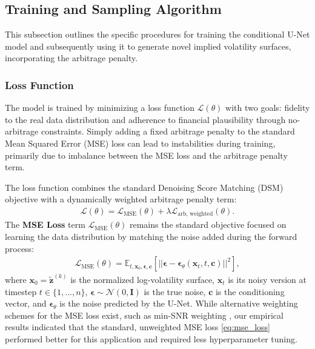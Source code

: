 \documentclass{article}
\newcommand{\eqlnostar}[2]{\begin{align}\label{#1}#2\end{align}}
\begin{document}
\subsection{Training and Sampling Algorithm}

This subsection outlines the specific procedures for training the conditional U-Net model and subsequently using it to generate novel implied volatility surfaces, incorporating the arbitrage penalty.

\subsubsection{Loss Function}

The model is trained by minimizing a loss function $\mathcal{L}(\theta)$ with two goals: fidelity to the real data distribution and adherence to financial plausibility through no-arbitrage constraints. Simply adding a fixed arbitrage penalty to the standard Mean Squared Error (MSE) loss can lead to instabilities during training, primarily due to imbalance between the MSE loss and the arbitrage penalty term.

The loss function combines the standard Denoising Score Matching (DSM) objective with a dynamically weighted arbitrage penalty term:
\eqlnostar{eq:total_loss}{
\mathcal{L}(\theta) = \mathcal{L}_{\text{MSE}}(\theta) + \lambda \mathcal{L}_{\text{arb, weighted}}(\theta).
}
The \textbf{MSE Loss} term $\mathcal{L}_{\text{MSE}}(\theta)$ remains the standard objective focused on learning the data distribution by matching the noise added during the forward process:
\eqlnostar{eq:mse_loss}{
\mathcal{L}_{\text{MSE}}(\theta) = \mathbb{E}_{t, \mathbf{x}_0, \boldsymbol{\epsilon}, \mathbf{c}} \left[ || \boldsymbol{\epsilon} - \boldsymbol{\epsilon}_\theta(\mathbf{x}_t, t, \mathbf{c}) ||^2 \right],
}
where $\mathbf{x}_0 = \tilde{\mathbf{z}}^{(k)}$ is the normalized log-volatility surface, $\mathbf{x}_t$ is its noisy version at timestep $t \in \{1, ..., n\}$, $\boldsymbol{\epsilon} \sim \mathcal{N}(0, \mathbf{I})$ is the true noise, $\mathbf{c}$ is the conditioning vector, and $\boldsymbol{\epsilon}_\theta$ is the noise predicted by the U-Net. While alternative weighting schemes for the MSE loss exist, such as min-SNR weighting \citep{Hang_Gu_Li_Bao_Chen_Hu_Geng_Guo_2024}, our empirical results indicated that the standard, unweighted MSE loss \eqref{eq:mse_loss} performed better for this application and required less hyperparameter tuning.
\end{document}
